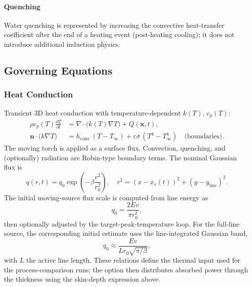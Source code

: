   \paragraph{Quenching}
  Water quenching is represented by increasing the convective heat-transfer coefficient after the end of a heating event (post-heating cooling); it does not introduce additional induction physics.

  \subsection{Governing Equations}

  \subsubsection{Heat Conduction}
  Transient 3D heat conduction with temperature-dependent $k(T)$, $c_p(T)$:
  \begin{align}
  \rho c_p(T) \frac{\partial T}{\partial t} &= \nabla \cdot \bigl(k(T) \nabla T\bigr) + Q(\mathbf{x},t), \\
  \mathbf{n}\cdot \bigl(k\nabla T\bigr) &= h_{\mathrm{conv}}\,(T - T_{\infty}) + \varepsilon\sigma\,(T^4 - T_{\infty}^4)\quad \text{(boundaries)}.
  \end{align}
  The moving torch is applied as a surface flux. Convection, quenching, and (optionally) radiation are Robin-type boundary terms. The nominal Gaussian flux is
  \begin{equation}
  q(r,t) = q_0 \exp\left(-\beta \frac{r^2}{r_0^2}\right),\quad r^2 = (x-x_s(t))^2 + (y-y_{\mathrm{line}})^2.
  \end{equation}
  The initial moving-source flux scale is computed from line energy as
  \begin{equation}
  q_0 = \frac{2 E v}{\pi r_0^2},
  \end{equation}
  then optionally adjusted by the target-peak-temperature loop. For the full-line source, the corresponding initial estimate uses the line-integrated Gaussian band,
  \begin{equation}
  q_0 \approx \frac{E v}{L r_0 \sqrt{\pi/\beta}},
  \end{equation}
  with $L$ the active line length. These relations define the thermal input used for the process-comparison runs; the  option then distributes absorbed power through the thickness using the skin-depth expression above.

